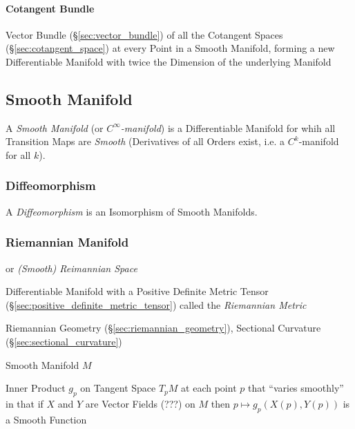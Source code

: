 \paragraph{Cotangent Bundle}\label{sec:cotangent_bundle}\hfill

Vector Bundle (\S\ref{sec:vector_bundle}) of all the Cotangent Spaces
(\S\ref{sec:cotangent_space}) at every Point in a Smooth Manifold, forming a
new Differentiable Manifold with twice the Dimension of the underlying Manifold



\subsection{Smooth Manifold}\label{sec:smooth_manifold}

A \emph{Smooth Manifold} (or \emph{$C^\infty$-manifold}) is a Differentiable
Manifold for whih all Transition Maps are \emph{Smooth} (Derivatives of
all Orders exist, i.e. a $C^k$-manifold for all $k$).



\subsubsection{Diffeomorphism}\label{sec:diffeomorphism}

A \emph{Diffeomorphism} is an Isomorphism of Smooth Manifolds.



\subsubsection{Riemannian Manifold}\label{sec:riemannian_manifold}


or \emph{(Smooth) Reimannian Space}

Differentiable Manifold with a Positive Definite Metric Tensor
(\S\ref{sec:positive_definite_metric_tensor}) called the
\emph{Riemannian Metric}

Riemannian Geometry (\S\ref{sec:riemannian_geometry}), Sectional Curvature
(\S\ref{sec:sectional_curvature})

Smooth Manifold $M$

Inner Product $g_p$ on Tangent Space $T_pM$ at each point $p$ that
``varies smoothly'' in that if $X$ and $Y$ are Vector Fields (???) on
$M$ then $p \mapsto g_p(X(p),Y(p))$ is a Smooth Function %

